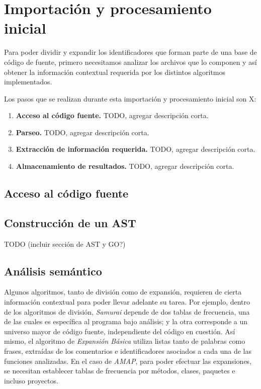 \section{Importación y procesamiento inicial}

Para poder dividir y expandir los identificadores que forman parte de una base de código de fuente, primero necesitamos analizar los archivos que lo componen y así obtener la información contextual requerida por los distintos algoritmos implementados.

Los pasos que se realizan durante esta importación y procesamiento inicial son X:
\begin{enumerate}
  \item \textbf{Acceso al código fuente.} TODO, agregar descripción corta.
  \item \textbf{Parseo.} TODO, agregar descripción corta.
  \item \textbf{Extracción de información requerida.} TODO, agregar descripción corta.
  \item \textbf{Almacenamiento de resultados.} TODO, agregar descripción corta.
\end{enumerate}

\subsection{Acceso al código fuente}

\subsection{Construcción de un AST}
TODO (incluir sección de AST y GO?)

\subsection{Análisis semántico}
Algunos algoritmos, tanto de división como de expansión, requieren de cierta información contextual para poder llevar adelante su tarea.
Por ejemplo, dentro de los algoritmos de división, \textit{Samurai} depende de dos tablas de frecuencia, una de las cuales es específica al programa bajo análisis; y la otra corresponde a un universo mayor de código fuente, independiente del código en cuestión.
Así mismo, el algoritmo de \textit{Expansión Básica} utiliza listas tanto de palabras como frases, extraídas de los comentarios e identificadores asociados a cada una de las funciones analizadas.
En el caso de \textit{AMAP}, para poder efectuar las expansiones, se necesitan establecer tablas de frecuencia por métodos, clases, paquetes e incluso proyectos.

